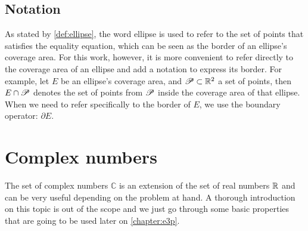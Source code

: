 \subsection{Notation}

As stated by \autoref{def:ellipse}, the word ellipse is used to refer to the set of points that satisfies the equality equation, which can be seen as the border of an ellipse's coverage area. For this work, however, it is more convenient to refer directly to the coverage area of an ellipse and add a notation to express its border. For example, let $E$ be an ellipse's coverage area, and $\mathscr{P} \subset \mathbb{R}^2$ a set of points, then $E \cap \mathscr{P}$ denotes the set of points from $\mathscr{P}$ inside the coverage area of that ellipse. When we need to refer specifically to the border of $E$, we use the boundary operator: $\partial E$.


\section{Complex numbers}

The set of complex numbers $\mathbb{C}$ is an extension of the set of real numbers $\mathbb{R}$ and can be very useful depending on the problem at hand. A thorough introduction on this topic is out of the scope and we just go through some basic properties that are going to be used later on \autoref{chapter:e3p}.

